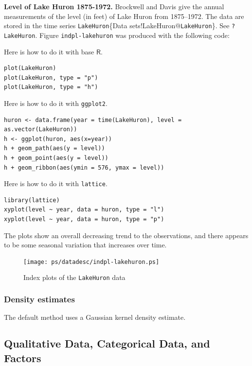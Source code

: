\documentclass[10pt,english]{scrbook}
\begin{document}
\begin{exampletoo}

\textbf{Level of Lake Huron 1875-1972.} Brockwell and Davis \cite{Brockwell1991} give the annual measurements of the level (in feet) of Lake Huron from 1875--1972. The data are stored in the time series \texttt{LakeHuron}\index\{Data sets!LakeHuron@\texttt{LakeHuron}\}. See \texttt{?LakeHuron}. Figure \texttt{indpl-lakehuron} was produced with the following code:

Here is how to do it with base \(\mathsf{R}\).

\begin{verbatim}
plot(LakeHuron)
plot(LakeHuron, type = "p")
plot(LakeHuron, type = "h")
\end{verbatim}

Here is how to do it with \texttt{ggplot2}.

\begin{verbatim}
huron <- data.frame(year = time(LakeHuron), level = as.vector(LakeHuron))
h <- ggplot(huron, aes(x=year)) 
h + geom_path(aes(y = level))
h + geom_point(aes(y = level))
h + geom_ribbon(aes(ymin = 576, ymax = level))
\end{verbatim}

Here is how to do it with \texttt{lattice}.

\begin{verbatim}
library(lattice)
xyplot(level ~ year, data = huron, type = "l")
xyplot(level ~ year, data = huron, type = "p")
\end{verbatim}


The plots show an overall decreasing trend to the observations, and there appears to be some seasonal variation that increases over time. 

\begin{figure}[th]
  \texttt{[image: ps/datadesc/indpl-lakehuron.ps]}
  \caption{Index plots of the \texttt{LakeHuron} data}
  \label{fig-indpl-lakehuron}
\end{figure}


\end{exampletoo}
\subsubsection[Density estimates]{Density estimates}
\label{sec-1-1-2-5}

The default method uses a Gaussian kernel density estimate.
\subsection[Qualitative Data, Categorical Data, and Factors]{Qualitative Data, Categorical Data, and Factors}
\label{sec-1-1-3}
\end{document}
